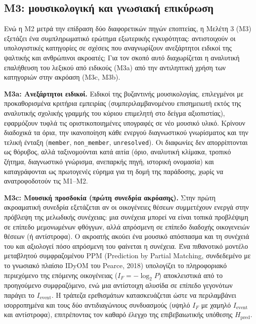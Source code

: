\documentclass[11pt,a4paper]{article}
\begin{document}
\subsection{Μ3: μουσικολογική και γνωσιακή επικύρωση}\label{ux3bc3-ux3bcux3bfux3c5ux3c3ux3b9ux3baux3bfux3bbux3bfux3b3ux3b9ux3baux3ae-ux3baux3b1ux3b9-ux3b3ux3bdux3c9ux3c3ux3b9ux3b1ux3baux3ae-ux3b5ux3c0ux3b9ux3baux3cdux3c1ux3c9ux3c3ux3b7}

Ενώ η Μ2 μετρά την επίδραση δύο διαφορετικών πηγών εποπτείας, η Μελέτη 3 (Μ3) εξετάζει ένα συμπληρωματικό ερώτημα εξωτερικής εγκυρότητας: αντιστοιχούν οι υπολογιστικές κατηγορίες σε σχέσεις που αναγνωρίζουν ανεξάρτητοι ειδικοί της ψαλτικής και ανθρώπινοι ακροατές; Για τον σκοπό αυτό διαχωρίζεται η αναλυτική επαλήθευση του λεξικού από ειδικούς (Μ3a) από την αντιληπτική χρήση των κατηγοριών στην ακρόαση (Μ3c, Μ3b).

\textbf{Μ3a: Ανεξάρτητοι ειδικοί.} Ειδικοί της βυζαντινής μουσικολογίας, επιλεγμένοι με προκαθορισμένα κριτήρια εμπειρίας (συμπεριλαμβανομένου επισημειωτή εκτός της αναλυτικής σχολικής γραμμής του κύριου επιμελητή στο δείγμα αξιοπιστίας), εφαρμόζουν τυφλά τις οριστικοποιημένες υπογραφές σε νέο μουσικό υλικό. Κρίνουν διαδοχικά τα όρια, την ικανοποίηση κάθε ενεργού διαγνωστικού γνωρίσματος και την τελική ένταξη (\texttt{member}, \texttt{non\_member}, \texttt{unresolved}). Οι διαφωνίες δεν απορρίπτονται ως θόρυβος, αλλά ταξινομούνται κατά αιτία (όριο, αναλυτική κλίμακα, τροπικό ζήτημα, διαγνωστικό γνώρισμα, ανεπαρκής πηγή, ιστορική ονομασία) και καταγράφονται ως πρωτογενές εύρημα για τη δομή της παράδοσης, χωρίς να ανατροφοδοτούν τις Μ1--Μ2.

\textbf{Μ3c: Μουσική προσδοκία (πρώτη συνεδρία ακρόασης).} Στην πρώτη ακροαματική συνεδρία εξετάζεται αν οι οικογένειες θέσεων συμμετέχουν ενεργά στην πρόβλεψη της μελωδικής συνέχειας: μια συνέχεια μπορεί να είναι τοπικά προβλέψιμη σε επίπεδο μεμονωμένων φθόγγων, αλλά απρόσμενη σε επίπεδο διαδοχής οικογενειών θέσεων (ή αντίστροφα). Ο ακροατής ακούει ένα μουσικό απόσπασμα και τη συνέχειά του και αξιολογεί πόσο απρόσμενη του φαίνεται η συνέχεια. Ένα πιθανοτικό μοντέλο μεταβλητού συμφραζομένου PPM (Prediction by Partial Matching, συνδεδεμένο με το γνωσιακό πλαίσιο IDyOM του Pearce, 2018) υπολογίζει το πληροφοριακό περιεχόμενο της επόμενης οικογένειας (\(I_F = -\log_2 P\)) αποκλειστικά από το προηγούμενο συμφραζόμενο, ενώ μια αντίστοιχη αλυσίδα σε επίπεδο γεγονότων παράγει το \(I_{\mathrm{event}}\). Η τράπεζα ερεθισμάτων κατασκευάζεται ώστε να περιλαμβάνει ισορροπημένα και τους δύο αντιδιαγώνιους συνδυασμούς (υψηλό \(I_F\) με χαμηλό \(I_{\mathrm{event}}\) και αντίστροφα), επιτρέποντας τον καθαρό έλεγχο της επιβεβαιωτικής υπόθεσης \(H_{\mathrm{pred}}\).
\end{document}
